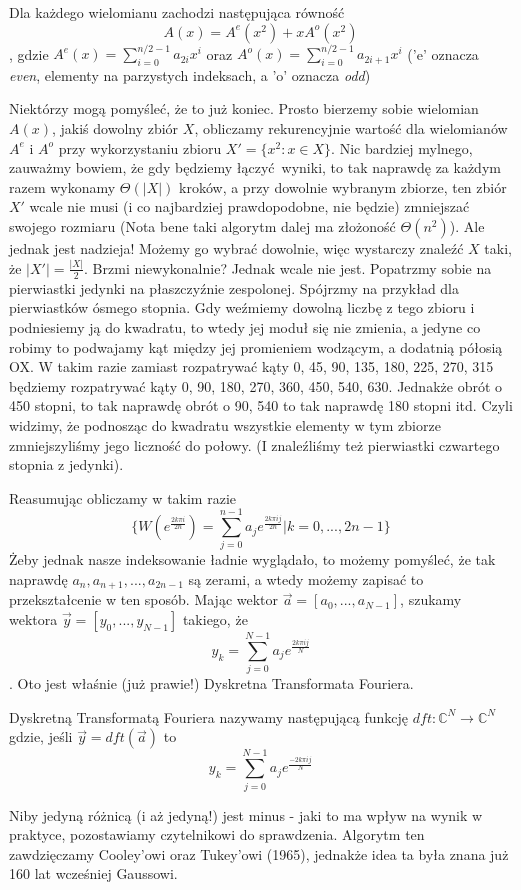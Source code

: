 \begin{observation_small}
Dla każdego wielomianu zachodzi następująca równość $$A(x) = A^e(x^2) + xA^o(x^2)$$, gdzie $A^e(x) = \sum_{i=0}^{n/2 - 1}a_{2i}x^i$ oraz $A^o(x) = \sum_{i=0}^{n/2 - 1} a_{2i+1}x^i$
('e' oznacza \textit{even}, elementy na parzystych indeksach, a 'o' oznacza \textit{odd})
\end{observation_small}
Niektórzy mogą pomyśleć, że to już koniec. Prosto bierzemy sobie wielomian $A(x)$, jakiś dowolny zbiór $X$, obliczamy rekurencyjnie wartość dla wielomianów $A^e$ i $A^o$ przy wykorzystaniu zbioru $X' = \{x^2 : x \in X\}$.
Nic bardziej mylnego, zauważmy bowiem, że gdy będziemy łączyć wyniki, to tak naprawdę za każdym razem wykonamy $\Theta(|X|)$ kroków, a przy dowolnie wybranym zbiorze, ten zbiór $X'$ wcale nie musi (i co najbardziej prawdopodobne, nie będzie) zmniejszać swojego rozmiaru
(Nota bene taki algorytm dalej ma złożoność $\Theta(n^2)$).
Ale jednak jest nadzieja! Możemy go wybrać dowolnie, więc wystarczy znaleźć $X$ taki, że $|X'| = \frac{|X|}{2}$. Brzmi niewykonalnie? Jednak wcale nie jest. Popatrzmy sobie na pierwiastki jedynki na płaszczyźnie zespolonej. Spójrzmy na przykład dla pierwiastków ósmego stopnia.
Gdy weźmiemy dowolną liczbę z tego zbioru i podniesiemy ją do kwadratu, to wtedy jej moduł się nie zmienia, a jedyne co robimy to podwajamy kąt między jej promieniem wodzącym, a dodatnią półosią OX. W takim razie zamiast rozpatrywać kąty 0, 45, 90, 135, 180, 225, 270, 315 będziemy rozpatrywać kąty 0, 90, 180, 270, 360, 450, 540, 630. Jednakże obrót o 450 stopni, to tak naprawdę obrót o 90, 540 to tak naprawdę 180 stopni itd.
Czyli widzimy, że podnosząc do kwadratu wszystkie elementy w tym zbiorze zmniejszyliśmy jego liczność do połowy. (I znaleźliśmy też pierwiastki czwartego stopnia z jedynki).

Reasumując obliczamy w takim razie $$\{W(e^{\frac{2k\pi i}{2n}}) = \sum_{j=0}^{n-1}a_je^{\frac{2k\pi ij}{2n}} | k = 0,...,2n-1\}$$
Żeby jednak nasze indeksowanie ładnie wyglądało, to możemy pomyśleć, że tak naprawdę $a_n, a_{n+1}, ..., a_{2n-1}$ są zerami, a wtedy możemy zapisać to przekształcenie w ten sposób.
Mając wektor $\vec{a} = [a_0, ..., a_{N-1}]$, szukamy wektora $\vec{y} = [y_0, ..., y_{N-1}]$ takiego, że
$$y_k = \sum_{j=0}^{N-1}a_je^{\frac{2k\pi ij}{N}}$$. Oto jest właśnie (już prawie!) Dyskretna Transformata Fouriera.
\begin{definition}
    Dyskretną Transformatą Fouriera nazywamy następującą funkcję $dft: \mathbb{C}^N \rightarrow \mathbb{C}^N$
    gdzie, jeśli $\vec{y} = dft(\vec{a})$ to $$y_k = \sum_{j=0}^{N-1}a_je^{\frac{-2k\pi ij}{N}}$$
\end{definition}
Niby jedyną różnicą (i aż jedyną!) jest minus - jaki to ma wpływ na wynik w praktyce, pozostawiamy czytelnikowi do sprawdzenia.
Algorytm ten zawdzięczamy Cooley'owi oraz Tukey'owi (1965), jednakże idea ta była znana już 160 lat wcześniej Gaussowi.

